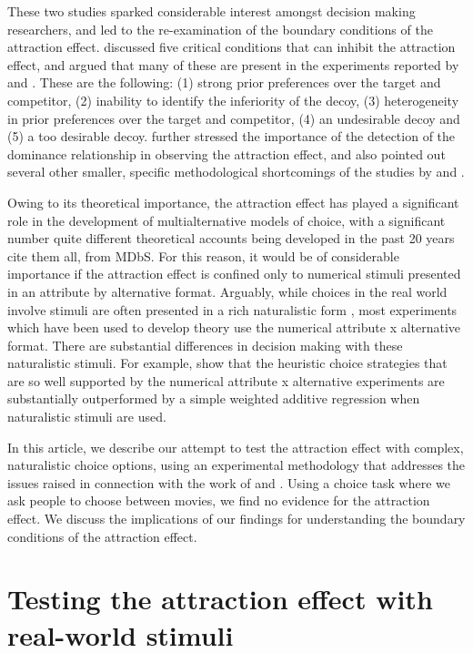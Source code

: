 \documentclass[12pt, a4paper]{article}
\begin{document}
These two studies sparked considerable interest amongst decision making researchers, and led to the re-examination of the boundary conditions of the attraction effect.  discussed five critical conditions that can inhibit the attraction effect, and argued that many of these are present in the experiments reported by \citeauthor{Frederick2014} and \citeauthor{Yang2014}. These are the following: (1) strong prior preferences over the target and competitor, (2) inability to identify the inferiority of the decoy, (3) heterogeneity in prior preferences over the target and competitor, (4) an undesirable decoy and (5) a too desirable decoy.  further stressed the importance of the detection of the dominance relationship in observing the attraction effect, and also pointed out several other smaller, specific methodological shortcomings of the studies by \citeauthor{Frederick2014} and \citeauthor{Yang2014}.


Owing to its theoretical importance, the attraction effect has played a significant role in the development of multialternative models of choice, with a significant number quite different theoretical accounts being developed in the past 20 years {cite them all, from MDbS}. For this reason, it would be of considerable importance if the attraction effect is confined only to numerical stimuli presented in an attribute by alternative format. Arguably, while choices in the real world involve stimuli are often presented in a rich naturalistic form \cite{Bhatia2018b}, most experiments which have been used to develop theory use the numerical attribute x alternative format. There are substantial differences in decision making with these naturalistic stimuli. For example, \citeauthor{Bhatia2018b} show that the heuristic choice strategies that are so well supported by the numerical attribute x alternative experiments are substantially outperformed by a simple weighted additive regression when naturalistic stimuli are used.

In this article, we describe our attempt to test the attraction effect with complex, naturalistic choice options, using an experimental methodology that addresses the issues raised in connection with the work of \citeauthor{Frederick2014} and \citeauthor{Yang2014}. Using a choice task where we ask people to choose between movies, we find no evidence for the attraction effect. We discuss the implications of our findings for understanding the boundary conditions of the attraction effect.

\section{Testing the attraction effect with real-world stimuli}
\end{document}
